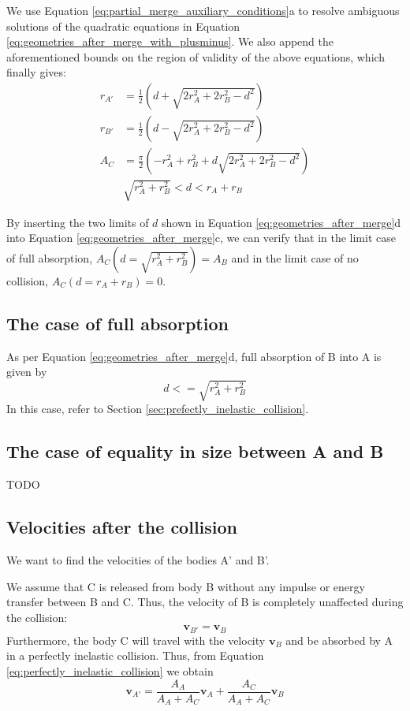 \documentclass{article}
\newcommand{\vbs}[0]{\boldsymbol{v}}
\begin{document}
We use Equation \ref{eq:partial_merge_auxiliary_conditions}a to resolve ambiguous solutions of the quadratic equations in Equation \ref{eq:geometries_after_merge_with_plusminus}. We also append the aforementioned bounds on the region of validity of the above equations, which finally gives:
\begin{equation}
\label{eq:geometries_after_merge}
\begin{split}
r_{A'} &= \frac{1}{2}\left(d + \sqrt{2r_A^2 + 2r_B^2 - d^2}\right)\\
r_{B'} &= \frac{1}{2}\left(d - \sqrt{2r_A^2 + 2r_B^2 - d^2}\right)\\
A_C &= \frac{\pi}{2}\left(-r_A^2 + r_B^2 + d\sqrt{2r_A^2 + 2r_B^2 - d^2}\right)\\
&\sqrt{r_A^2 + r_B^2} < d < r_A + r_B
\end{split}
\end{equation}

By inserting the two limits of $d$ shown in Equation \ref{eq:geometries_after_merge}d into Equation \ref{eq:geometries_after_merge}c, we can verify that in the limit case of full absorption, $A_C(d = \sqrt{r_A^2 + r_B^2}) = A_B$ and in the limit case of no collision, $A_C(d = r_A + r_B) = 0$.

\subsection{The case of full absorption}
As per Equation \ref{eq:geometries_after_merge}d, full absorption of B into A is given by
\begin{equation}
d <= \sqrt{r_A^2 + r_B^2}
\end{equation}
In this case, refer to Section \ref{sec:prefectly_inelastic_collision}.

\subsection{The case of equality in size between A and B}
TODO



\subsection{Velocities after the collision}
We want to find the velocities of the bodies A' and B'.

We assume that C is released from body B without any impulse or energy transfer between B and C. Thus, the velocity of B is completely unaffected during the collision:
\begin{equation}
\vbs_{B'} = \vbs_B
\end{equation}
Furthermore, the body C will travel with the velocity $\vbs_B$ and be absorbed by A in a perfectly inelastic collision. Thus, from Equation \ref{eq:perfectly_inelastic_collision} we obtain
\begin{equation}
\vbs_{A'} = \frac{A_A}{A_A + A_C}\vbs_A + \frac{A_C}{A_A + A_C}\vbs_B
\end{equation}
\end{document}
